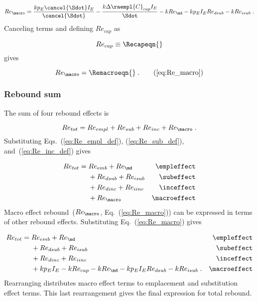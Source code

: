\begin{equation}
  Re_{\macro} = \frac{k p_E \cancel{\Sdot} I_E}{\cancel{\Sdot}}
                                - \frac{k \Delta \raempl{C}_{cap} I_E}{\Sdot}
                                - k Re_{\md}
                                - k p_E I_E Re_{dsub}
                                - k Re_{isub} \; .
\end{equation}
%
Canceling terms and defining $Re_{cap}$ as

\begin{equation} \label{eq:Re_cap}
  Re_{cap} \equiv \Recapeqn{}
\end{equation}
%
gives

\begin{equation}
  Re_{\macro} = \Remacroeqn{} \; . \tag{\ref{eq:Re_macro}}
\end{equation}


\subsubsection{Rebound sum} 
\label{sec:total_rebound}

The sum of four rebound effects is 

\begin{equation}
  Re_{tot} = Re_{empl} + Re_{sub} + Re_{inc} + Re_{\macro} \; .
\end{equation}
%
Substituting Eqs.~(\ref{eq:Re_empl_def}), (\ref{eq:Re_sub_def}), and~(\ref{eq:Re_inc_def}) gives

\begin{align}
  Re_{tot} = \; &Re_{emb} + Re_{\md}      & \mathrm{\empleffect} \nonumber \\
                &+ Re_{dsub} + Re_{isub}   & \mathrm{\subeffect}  \nonumber \\
                &+ Re_{dinc} + Re_{iinc}   & \mathrm{\inceffect}  \nonumber \\
                &+ Re_{\macro}      & \mathrm{\macroeffect}
\end{align}
%
Macro effect rebound~($Re_{\macro}$, Eq.~(\ref{eq:Re_macro}))
can be expressed in terms of other rebound effects.
Substituting Eq.~(\ref{eq:Re_macro}) gives

\begin{align}
  Re_{tot} = \; &Re_{emb} + Re_{\md}      & \mathrm{\empleffect}       \nonumber \\
                &+ Re_{dsub} + Re_{isub}   & \mathrm{\subeffect}        \nonumber \\
                &+ Re_{dinc} + Re_{iinc}   & \mathrm{\inceffect}        \nonumber \\
                &+ k p_E I_E - k Re_{cap} - k Re_{\md} - k p_E I_E Re_{dsub} - k Re_{isub} \; .  & \mathrm{\macroeffect}
\end{align}
%
Rearranging distributes macro effect terms 
to emplacement and substitution effect terms.
This last rearrangement gives the final expression for total rebound.

